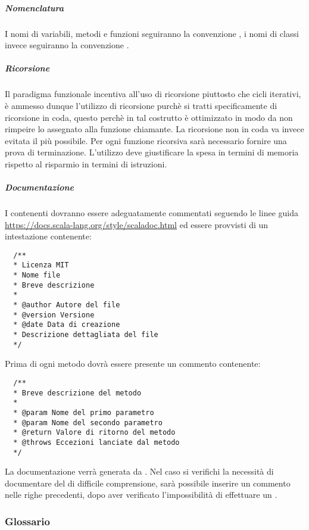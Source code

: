 \documentclass{scalatekids-article}
\begin{document}
\subparagraph{Nomenclatura}

I nomi di variabili, metodi e funzioni seguiranno la convenzione
\textit{}, i nomi di classi invece seguiranno la
convenzione \textit{}.

\subparagraph{Ricorsione}

Il paradigma funzionale incentiva all'uso di ricorsione piuttosto che cicli
iterativi, è ammesso dunque l'utilizzo di ricorsione purchè si tratti
specificamente di ricorsione in coda, questo perchè in  tal
costrutto è ottimizzato in modo da non rimpeire lo  assegnato alla
funzione chiamante. La ricorsione non in coda va invece evitata il più
possibile. Per ogni funzione ricorsiva sarà necessario fornire una prova di
terminazione. L'utilizzo deve giustificare la spesa in termini di memoria
rispetto al risparmio in termini di istruzioni.

\subparagraph{Documentazione}

I  contenenti  dovranno essere adeguatamente commentati seguendo le
linee guida  \url{https://docs.scala-lang.org/style/scaladoc.html} ed essere provvisti di un
intestazione contenente:
\begin{lstlisting}
  /**
  * Licenza MIT
  * Nome file
  * Breve descrizione
  *
  * @author Autore del file
  * @version Versione
  * @date Data di creazione
  * Descrizione dettagliata del file
  */
\end{lstlisting}
Prima di ogni metodo dovrà essere presente un commento  contenente:
\begin{lstlisting}
  /**
  * Breve descrizione del metodo
  *
  * @param Nome del primo parametro
  * @param Nome del secondo parametro
  * @return Valore di ritorno del metodo
  * @throws Eccezioni lanciate dal metodo
  */
\end{lstlisting}
La documentazione verrà generata da . Nel caso si verifichi la
necessità di documentare del  di difficile comprensione, sarà possibile
inserire un commento nelle righe precedenti, dopo aver verificato
l'impossibilità di effettuare un .

\subsubsection{Glossario}
\end{document}
